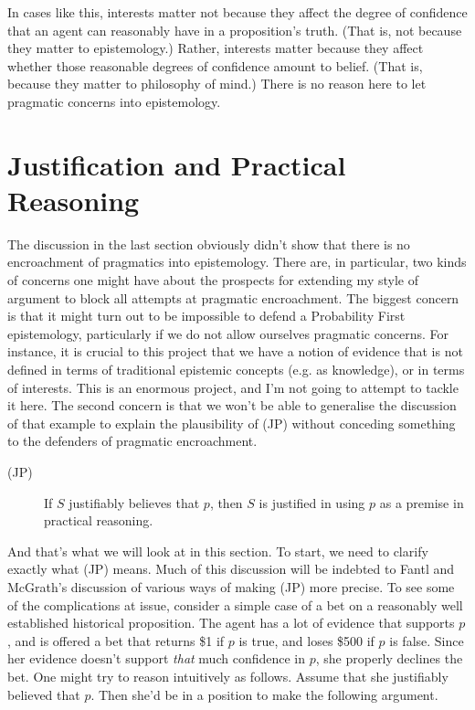 In cases like this, interests matter not because they affect the degree of confidence that an agent can reasonably have in a proposition's truth. (That is, not because they matter to epistemology.) Rather, interests matter because they affect whether those reasonable degrees of confidence amount to belief. (That is, because they matter to philosophy of mind.) There is no reason here to let pragmatic concerns into epistemology.

\section{Justification and Practical Reasoning}

The discussion in the last section obviously didn't show that there is no encroachment of pragmatics into epistemology. There are, in particular, two kinds of concerns one might have about the prospects for extending my style of argument to block all attempts at pragmatic encroachment. The biggest concern is that it might turn out to be impossible to defend a Probability First epistemology, particularly if we do not allow ourselves pragmatic concerns. For instance, it is crucial to this project that we have a notion of evidence that is not defined in terms of traditional epistemic concepts (e.g. as knowledge), or in terms of interests. This is an enormous project, and I'm not going to attempt to tackle it here. The second concern is that we won't be able to generalise the discussion of that example to explain the plausibility of (JP) without conceding something to the defenders of pragmatic encroachment.

\begin{description}
\item[(JP)] If \(S\)  justifiably believes that \(p\), then \(S\)  is justified in using \(p\) as a premise in practical reasoning.
\end{description}

\noindent And that's what we will look at in this section. To start, we need to clarify exactly what (JP) means. Much of this discussion will be indebted to Fantl and McGrath's discussion of various ways of making (JP) more precise. To see some of the complications at issue, consider a simple case of a bet on a reasonably well established historical proposition. The agent has a lot of evidence that supports \(p\), and is offered a bet that returns \$1 if \(p\) is true, and loses \$500 if \(p\) is false. Since her evidence doesn't support \textit{that} much confidence in \(p\), she properly declines the bet. One might try to reason intuitively as follows. Assume that she justifiably believed that \(p\). Then she'd be in a position to make the following argument.


